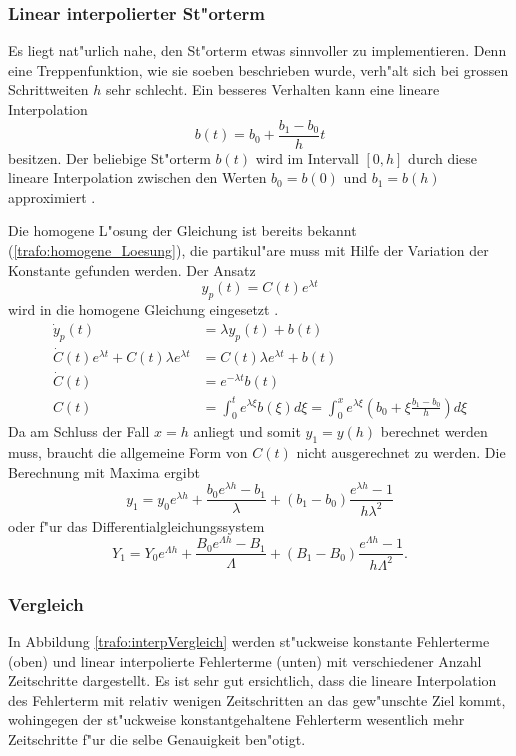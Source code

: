 \begin{refsection}
\subsubsection{Linear interpolierter St"orterm}
Es liegt nat"urlich nahe, den St"orterm etwas sinnvoller zu implementieren. Denn eine Treppenfunktion, wie sie soeben beschrieben wurde, verh"alt sich bei grossen Schrittweiten $h$ sehr schlecht. Ein besseres Verhalten kann eine lineare Interpolation
\begin{equation*}
	b(t) = b_0 + \frac{b_1 - b_0}{h}t
\end{equation*}
besitzen. Der beliebige St"orterm $b(t)$ wird im Intervall $[0,h]$ durch diese lineare Interpolation zwischen den Werten $b_0 = b(0)$ und $b_1 = b(h)$ approximiert \cite{trafo:Mueller}.

Die homogene L"osung der Gleichung ist bereits bekannt (\ref{trafo:homogene_Loesung}), die partikul"are muss mit Hilfe der Variation der Konstante gefunden werden. Der Ansatz
\begin{equation*}
	y_p(t) = C(t)e^{\lambda t}
\end{equation*}
wird in die homogene Gleichung eingesetzt \cite{trafo:Mueller}.
\begin{align*}
	\dot{y}_p(t) &= \lambda y_p(t) + b(t) \\
	\dot{C}(t)e^{\lambda t} + C(t)\lambda e^{\lambda t} &= C(t) \lambda e^{\lambda t} + b(t) \\
	\dot{C}(t) &= e^{-\lambda t} b(t) \\
	C(t) &= \int_{0}^{t} e^{\lambda \xi} b(\xi) d\xi = \int_{0}^{x} e^{\lambda \xi} \left(b_0 + \xi \frac{b_1 - b_0}{h}\right) d\xi
\end{align*}
Da am Schluss der Fall $x = h$ anliegt und somit $y_1 = y(h)$ berechnet werden muss, braucht die allgemeine Form von $C(t)$ nicht ausgerechnet zu werden. Die Berechnung mit Maxima ergibt \cite{trafo:Mueller}
\begin{equation}
	y_1 = y_0 e^{\lambda h} + \frac{b_0 e^{\lambda h} - b_1}{\lambda} + \left(b_1 - b_0\right) \frac{e^{\lambda h} -1}{h \lambda^2}
	\label{trafo:linInterp}
\end{equation}
oder f"ur das Differentialgleichungssystem
\begin{equation}
	Y_1 = Y_0 e^{\Lambda h} + \frac{B_0 e^{\Lambda h} - B_1}{\Lambda} + \left(B_1 - B_0\right) \frac{e^{\Lambda h} -1}{h \Lambda^2}.
	\label{trafo:exakteLoesung}
\end{equation}

\subsubsection{Vergleich}
In Abbildung \ref{trafo:interpVergleich} werden st"uckweise konstante Fehlerterme (oben) und linear interpolierte Fehlerterme (unten) mit verschiedener Anzahl Zeitschritte dargestellt. Es ist sehr gut ersichtlich, dass die lineare Interpolation des Fehlerterm mit relativ wenigen Zeitschritten an das gew"unschte Ziel kommt, wohingegen der st"uckweise konstantgehaltene Fehlerterm wesentlich mehr Zeitschritte f"ur die selbe Genauigkeit ben"otigt. 


\end{refsection}
